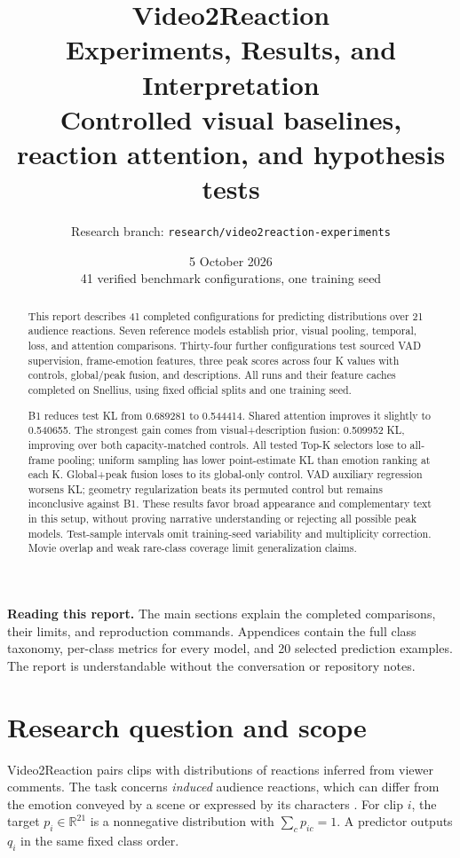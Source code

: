\documentclass[11pt,a4paper]{article}
\title{\textcolor{ink}{\textbf{Video2Reaction}}\\[5pt]
Experiments, Results, and Interpretation\\[5pt]
\large Controlled visual baselines, reaction attention, and hypothesis tests}
\author{Research branch: \texttt{research/video2reaction-experiments}}
\date{5 October 2026\\\small 41 verified benchmark configurations, one training seed}
\begin{document}
\maketitle
\begin{abstract}
This report describes 41 completed configurations for predicting distributions over 21 audience reactions. Seven reference models establish prior, visual pooling, temporal, loss, and attention comparisons. Thirty-four further configurations test sourced VAD supervision, frame-emotion features, three peak scores across four K values with controls, global/peak fusion, and descriptions. All runs and their feature caches completed on Snellius, using fixed official splits and one training seed.

B1 reduces test KL from 0.689281 to 0.544414. Shared attention improves it slightly to 0.540655. The strongest gain comes from visual+description fusion: 0.509952 KL, improving over both capacity-matched controls. All tested Top-K selectors lose to all-frame pooling; uniform sampling has lower point-estimate KL than emotion ranking at each K. Global+peak fusion loses to its global-only control. VAD auxiliary regression worsens KL; geometry regularization beats its permuted control but remains inconclusive against B1. These results favor broad appearance and complementary text in this setup, without proving narrative understanding or rejecting all possible peak models. Test-sample intervals omit training-seed variability and multiplicity correction. Movie overlap and weak rare-class coverage limit generalization claims.
\end{abstract}

\vspace{4pt}
\colorbox{soft}{\parbox{0.94\textwidth}{\textbf{Reading this report.} The main sections explain the completed comparisons, their limits, and reproduction commands. Appendices contain the full class taxonomy, per-class metrics for every model, and 20 selected prediction examples. The report is understandable without the conversation or repository notes.}}
\clearpage
\tableofcontents
\clearpage

\section{Research question and scope}
Video2Reaction pairs clips with distributions of reactions inferred from viewer comments. The task concerns \emph{induced} audience reactions, which can differ from the emotion conveyed by a scene or expressed by its characters \cite{paper}. For clip $i$, the target $p_i\in\mathbb{R}^{21}$ is a nonnegative distribution with $\sum_c p_{ic}=1$. A predictor outputs $q_i$ in the same fixed class order.
\end{document}
